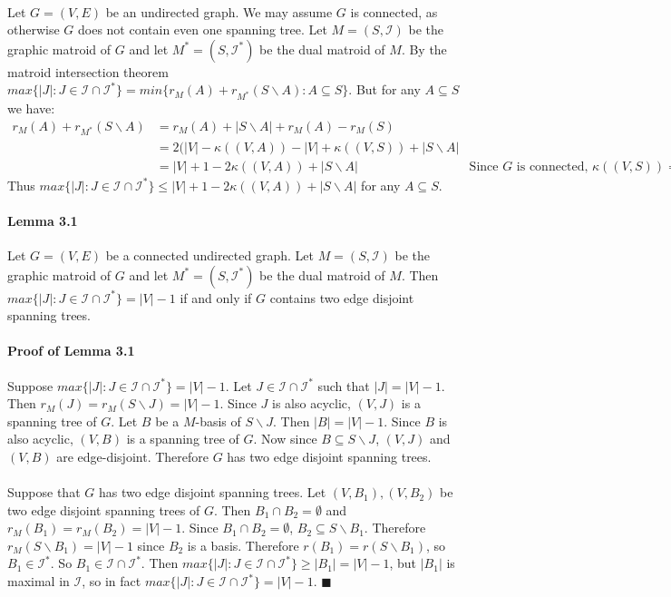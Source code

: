 \documentclass[letterpaper,12pt,oneside,onecolumn]{report}
\begin{document}
\paragraph{}
Let $G = (V,E)$ be an undirected graph. We may assume $G$ is connected, as otherwise $G$ does not contain even one spanning tree. Let $M=(S,\mathcal{I})$ be the graphic matroid of $G$ and let $M^*=(S,\mathcal{I}^*)$ be the dual matroid of $M$. By the matroid intersection theorem $max\{|J| : J \in \mathcal{I} \cap \mathcal{I}^* \} = min \{r_M(A) + r_{M^*}(S\backslash A) : A \subseteq S \}$. But for any $A \subseteq S$ we have:
\begin{align*}
r_M(A) + r_{M^*}(S\backslash A) &= r_M(A) + |S\backslash A| + r_{M}(A) - r_M(S) \\
&= 2(|V| - \kappa((V,A)) - |V| + \kappa((V,S)) + |S\backslash A|\\
&= |V| + 1 -2\kappa((V,A)) + |S\backslash A| &\text{Since $G$ is connected, $\kappa((V,S))=1$.}
\end{align*}
Thus $max\{|J| : J \in \mathcal{I} \cap \mathcal{I}^* \} \leq |V| + 1 - 2\kappa((V,A)) + |S\backslash A|$ for any $A \subseteq S$.
\paragraph{Lemma 3.1}
Let $G = (V,E)$ be a connected undirected graph. Let $M=(S,\mathcal{I})$ be the graphic matroid of $G$ and let $M^*=(S,\mathcal{I}^*)$ be the dual matroid of $M$. Then $max\{|J| : J \in \mathcal{I} \cap \mathcal{I}^* \} = |V| - 1$ if and only if $G$ contains two edge disjoint spanning trees.
\paragraph{Proof of Lemma 3.1}
Suppose $max\{|J| : J \in \mathcal{I} \cap \mathcal{I}^* \} = |V| - 1$.  Let $J \in \mathcal{I} \cap \mathcal{I}^*$ such that $|J| = |V|-1$. Then $r_M(J) = r_{M}(S\backslash J) = |V| - 1$. Since $J$ is also acyclic, $(V,J)$ is a spanning tree of $G$. Let $B$ be a $M$-basis of $S\backslash J$. Then $|B| = |V|-1$. Since $B$ is also acyclic, $(V,B)$ is a spanning tree of $G$. Now since $B \subseteq S\backslash J$, $(V,J)$ and $(V,B)$ are edge-disjoint. Therefore $G$ has two edge disjoint spanning trees.
\paragraph{}
Suppose that $G$ has two edge disjoint spanning trees. Let $(V,B_1), (V,B_2)$ be two edge disjoint spanning trees of $G$. Then $B_1 \cap B_2 = \emptyset$ and $r_M(B_1) = r_M(B_2) = |V| - 1$. Since $B_1 \cap B_2 = \emptyset$, $B_2 \subseteq S\backslash B_1$. Therefore $r_M(S\backslash B_1) = |V|-1$ since $B_2$ is a basis. Therefore $r(B_1) = r(S\backslash B_1)$, so $B_1 \in \mathcal{I}^*$. So $B_1 \in \mathcal{I} \cap \mathcal{I}^*$. Then $max\{|J| : J \in \mathcal{I} \cap \mathcal{I}^* \} \geq |B_1| = |V|-1$, but $|B_1|$ is maximal in $\mathcal{I}$, so in fact $max\{|J| : J \in \mathcal{I} \cap \mathcal{I}^* \} = |V| - 1$. $\blacksquare$
\end{document}
